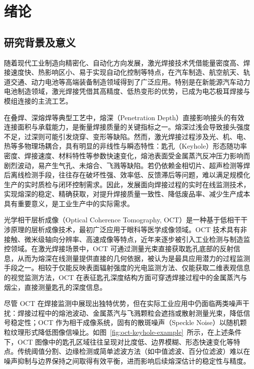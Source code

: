 \clearpage

\section{绪论}

\subsection{研究背景及意义}

随着现代工业制造向精密化、自动化方向发展，激光焊接技术凭借能量密度高、焊接速度快、热影响区小、易于实现自动化控制等特点，在汽车制造、航空航天、轨道交通、动力电池等高端装备制造领域得到了广泛应用。特别是在新能源汽车动力电池制造领域，激光焊接凭借其高精度、低热变形的优势，已成为电芯极耳焊接与模组连接的主流工艺。

在叠焊、深熔焊等典型工艺中，熔深（Penetration Depth）直接影响接头的有效连接面积与承载能力，是衡量焊接质量的关键指标之一。熔深过浅会导致接头强度不足，过深则可能引发烧穿、变形等缺陷。然而，激光焊接过程涉及光、机、电、热等多物理场耦合，具有明显的非线性与瞬态特性：匙孔（Keyhole）形态随功率密度、焊接速度、材料特性等参数快速变化，熔池表面受金属蒸汽反冲压力影响而剧烈波动，易产生气孔、未熔合、飞溅等缺陷。若仍依赖金相切片、超声检测等焊后离线检测手段，往往存在破坏性强、效率低、反馈滞后等问题，难以满足规模化生产的实时质检与闭环控制需求。因此，发展面向焊接过程的实时在线监测技术，实现熔深的稳定、精确获取，对提升焊接质量一致性、降低废品率、减少生产成本具有重要意义，是工业生产中的实际需求。

光学相干层析成像（Optical Coherence Tomography, OCT）是一种基于低相干干涉原理的层析成像技术，最初广泛应用于眼科等医学成像领域。OCT 技术具有非接触、微米级轴向分辨率、高速成像等特点，近年来逐步被引入工业检测与制造监控领域。在激光焊接场景中，OCT 可通过测量光束直接获取匙孔底部的反射信息，从而为熔深在线测量提供直接的几何依据，被认为是最具应用潜力的过程监测手段之一。相较于仅能反映表面辐射强度的光电监测方法、仅能获取二维表观信息的视觉监测方法，OCT 在表征匙孔深度结构方面可穿透焊接过程中的金属蒸汽与烟尘，直接测量匙孔的深度信息。

尽管 OCT 在焊接监测中展现出独特优势，但在实际工业应用中仍面临两类噪声干扰：焊接过程中的熔池波动、金属蒸汽与飞溅颗粒会遮挡或散射测量光束，降低信号稳定性；OCT 作为相干成像系统，固有的散斑噪声（Speckle Noise）以随机颗粒纹理形式降低图像信噪比。如图~\ref{fig:oct-keyhole-example}~所示，在上述条件下，OCT 图像中的匙孔区域往往呈现对比度低、边界模糊、形态快速变化等特点。传统阈值分割、边缘检测或简单滤波方法（如中值滤波、百分位滤波）难以在噪声抑制与边界保持之间取得有效平衡，进而影响后续熔深估计的稳定性与精度。

